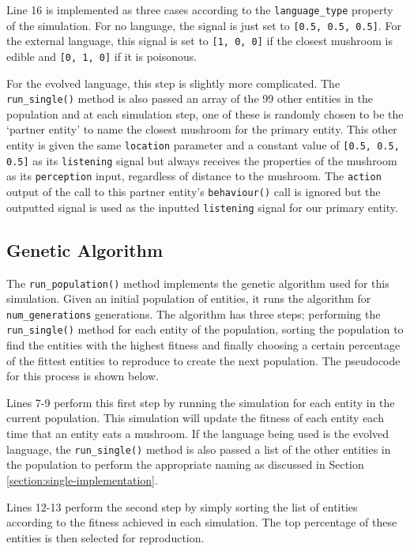 \documentclass[12pt,a4paper]{report}
\begin{document}
Line 16 is implemented as three cases according to the \texttt{language\_type} property of the simulation. For no language, the signal is just set to \texttt{[0.5, 0.5, 0.5]}. For the external language, this signal is set to \texttt{[1, 0, 0]} if the closest mushroom is edible and \texttt{[0, 1, 0]} if it is poisonous.

For the evolved language, this step is slightly more complicated. The \texttt{run\_single()} method is also passed an array of the 99 other entities in the population and at each simulation step, one of these is randomly chosen to be the `partner entity' to name the closest mushroom for the primary entity. This other entity is given the same \texttt{location} parameter and a constant value of \texttt{[0.5, 0.5, 0.5]} as its \texttt{listening} signal but always receives the properties of the mushroom as its \texttt{perception} input, regardless of distance to the mushroom. The \texttt{action} output of the call to this partner entity's \texttt{behaviour()} call is ignored but the outputted signal is used as the inputted \texttt{listening} signal for our primary entity.

\subsection{Genetic Algorithm}

The \texttt{run\_population()} method implements the genetic algorithm used for this simulation. Given an initial population of entities, it runs the algorithm for \texttt{num\_generations} generations. The algorithm has three steps; performing the \texttt{run\_single()} method for each entity of the population, sorting the population to find the entities with the highest fitness and finally choosing a certain percentage of the fittest entities to reproduce to create the next population. The pseudocode for this process is shown below.

Lines 7-9 perform this first step by running the simulation for each entity in the current population. This simulation will update the fitness of each entity each time that an entity eats a mushroom. If the language being used is the evolved language, the \texttt{run\_single()} method is also passed a list of the other entities in the population to perform the appropriate naming as discussed in Section \ref{section:single-implementation}.

Lines 12-13 perform the second step by simply sorting the list of entities according to the fitness achieved in each simulation. The top percentage of these entities is then selected for reproduction.
\end{document}
